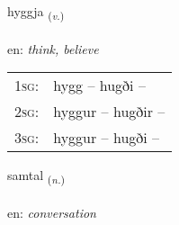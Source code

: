 \documentclass[frontgrid, backgrid]{flacards}\usepackage[]{graphicx}\usepackage[]{color}
\begin{document}
\renewcommand{\blhead}{\vskip5pt {\small\bfseries\footnotesize Sagnorð | Verb }}
\renewcommand{\bcfoot}{\vskip5pt \hspace{2pt}{\small\bfseries\footnotesize 2K}}


{hyggja \small{\textsubscript{(\textit{v.})}} \\[1ex] %
\textphonetic{[hɪca]} \\
en: \emph{think, believe} \\  [2ex]
\renewcommand*{\arraystretch}{0.8}
\begin{tabular}{p{1cm}l}
\textsc{1sg}: & hygg -- hugði --  \\ 
\textsc{2sg}: & hyggur -- hugðir --  \\ 
\textsc{3sg}: & hyggur -- hugði --  \\ 
\end{tabular}
}

\renewcommand{\flhead}{\vskip5pt \fboxsep=0pt {\small\bfseries\footnotesize Nafnorð | Noun}}
\renewcommand{\fcfoot}{\vskip5pt \fboxsep=0pt \hspace{2pt}{\small\bfseries\footnotesize 2K}}

\renewcommand{\blhead}{\vskip5pt {\small\bfseries\footnotesize Nafnorð | Noun }}
\renewcommand{\bcfoot}{\vskip5pt \hspace{2pt}{\small\bfseries\footnotesize 2K}}


{samtal \small{\textsubscript{(\textit{n.})}} \\[1ex] %
\textphonetic{[samtʰal]} \\
en: \emph{conversation} \\  [2ex]
\renewcommand*{\arraystretch}{0.8}
}

\renewcommand{\flhead}{\vskip5pt \fboxsep=0pt {\small\bfseries\footnotesize Nafnorð | Noun}}
\renewcommand{\fcfoot}{\vskip5pt \fboxsep=0pt \hspace{2pt}{\small\bfseries\footnotesize 2K}}
\end{document}
